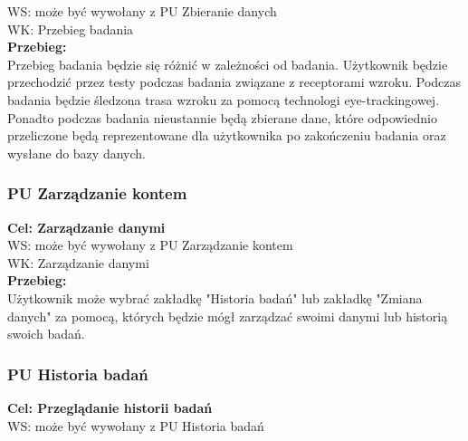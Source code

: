 \documentclass[12pt, letterpaper]{article}
\begin{document}
		WS: może być wywołany z PU Zbieranie danych\\
		
		WK: Przebieg badania\\
		
		\textbf{Przebieg: }\\
		Przebieg badania będzie się różnić w zależności od badania. Użytkownik będzie przechodzić przez testy podczas badania związane z receptorami wzroku. Podczas badania będzie śledzona trasa wzroku za pomocą technologi eye-trackingowej. Ponadto podczas badania nieustannie będą zbierane dane, które odpowiednio przeliczone będą reprezentowane dla użytkownika po zakończeniu badania oraz wysłane do bazy danych.
		 \\
		 
		
		\subsubsection{PU Zarządzanie kontem}
		
		\quad
		
		\textbf{Cel: Zarządzanie danymi}\\
		
		WS: może być wywołany z PU Zarządzanie kontem\\
		
		WK: Zarządzanie danymi\\
		
		\textbf{Przebieg:}\\
		Użytkownik może wybrać zakładkę "Historia badań" lub zakładkę "Zmiana danych" za pomocą, których będzie mógł zarządzać swoimi danymi lub historią swoich badań.
		 \\
		 
		
		\subsubsection{PU Historia badań}
		
		\quad
		
		\textbf{Cel: Przeglądanie historii badań}\\
		
		WS: może być wywołany z PU Historia badań\\
		
\end{document}
